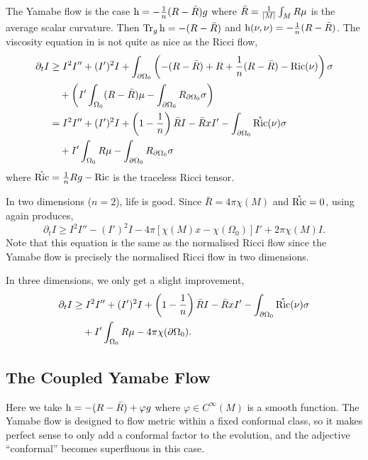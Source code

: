 \documentclass{amsart}
\begin{document}
The Yamabe flow is the case \(\operatorname{h} = -\tfrac{1}{n}(R - \bar{R})g\) where \(\bar{R} = \tfrac{1}{\left|{M}\right|} \int_M R \mu\) is the average scalar curvature. Then \(\operatorname{Tr}_g \operatorname{h} = -(R - \bar{R})\) and \(\operatorname{h}(\nu, \nu) = -\tfrac{1}{n}(R - \bar{R})\). The viscosity equation in  is not quite as nice as the Ricci flow,
\[
\begin{split}
\partial_t I &\geq I^2 I'' +  (I')^2 I + \int_{\partial {\Omega_0}} \left(-(R - \bar{R}) + R + \frac{1}{n}(R - \bar{R}) - \operatorname{Ric}(\nu)\right) \sigma \\
&\quad + \left(I'\int_{\Omega_0} (R - \bar{R}) \mu - \int_{\partial {\Omega_0}} R_{\partial {\Omega_0}}\sigma \right) \\
&= I^2 I'' +  (I')^2 I + \left(1 - \frac{1}{n}\right) \bar{R} I - \bar{R}xI' - \int_{\partial {\Omega_0}} \mathring{\operatorname{Ric}} (\nu) \sigma \\
&\quad + I' \int_{\Omega_0} R \mu - \int_{\partial {\Omega_0}} R_{\partial {\Omega_0}}\sigma
\end{split}
\]
where \(\mathring{\operatorname{Ric}} = \tfrac{1}{n}Rg - \operatorname{Ric}\) is the traceless Ricci tensor.

In two dimensions (\(n=2\)), life is good. Since \(\bar{R} = 4\pi \chi(M)\) and \(\mathring{\operatorname{Ric}} = 0\), using  again produces,
\[
\partial_t I \geq I^2 I'' -  (I')^2 I - 4\pi\left[\chi(M)x - \chi(\Omega_0)\right]I' + 2\pi\chi(M) I.
\]
Note that this equation is the same as the normalised Ricci flow since the Yamabe flow is precisely the normalised Ricci flow in two dimensions.

In three dimensions, we only get a slight improvement,
\[
\begin{split}
\partial_t I &\geq I^2 I'' +  (I')^2 I + \left(1 - \frac{1}{n}\right) \bar{R} I - \bar{R}xI' - \int_{\partial {\Omega_0}} \mathring{\operatorname{Ric}} (\nu) \sigma \\
&\quad + I' \int_{\Omega_0} R \mu - 4\pi\chi(\partial {\Omega_0}).
\end{split}
\]


\subsection{The Coupled Yamabe Flow }
\label{subsec:flows_yamabe_coupled}

Here we take \(\operatorname{h} = -(R - \bar{R}) + \varphi g\) where \(\varphi \in C^{\infty}(M)\) is a smooth function. The Yamabe flow is designed to flow metric within a fixed conformal class, so it makes perfect sense to only add a conformal factor to the evolution, and the adjective ``conformal'' becomes superfluous in this case.
\end{document}
